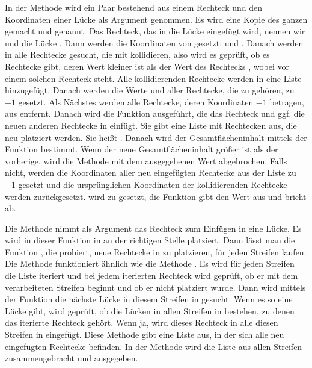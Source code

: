 In der Methode  wird ein Paar bestehend
aus einem Rechteck und den Koordinaten einer Lücke als Argument genommen.
Es wird eine Kopie des ganzen   gemacht
und  genannt. 
Das Rechteck, das in die Lücke eingefügt wird, nennen wir  und
die Lücke .
Dann werden die Koordinaten von  gesetzt:  und
.
Danach werden in  alle Rechtecke gesucht, die mit
 kollidieren, also wird es geprüft, ob es Rechtecke gibt, deren
Wert  kleiner ist als der Wert  des Rechtecks , 
wobei  vor einem solchen Rechteck steht.
Alle kollidierenden Rechtecke werden in eine Liste 
hinzugefügt. 
Danach werden die Werte  und  aller Rechtecke, die zu 
gehören, zu $-1$ gesetzt.
Als Nächstes werden alle Rechtecke, deren Koordinaten $-1$ betragen, aus 
entfernt.
Danach wird die Funktion  ausgeführt, die das Rechteck  und ggf.
die neuen anderen Rechtecke in  einfügt.
Sie gibt eine Liste mit Rechtecken aus, die neu platziert werden. Sie heißt .
Danach wird der Gesamtflächeninhalt mittels der Funktion 
bestimmt.
Wenn der neue Gesamtflächeninhalt größer ist als der vorherige,
wird die Methode  mit dem ausgegebenen Wert  abgebrochen.
Falls nicht, werden die Koordinaten
aller neu eingefügten Rechtecke aus der Liste 
zu $-1$ gesetzt und die 
ursprünglichen Koordinaten der kollidierenden Rechtecke werden zurückgesetzt. 
 wird zu  gesetzt, die Funktion gibt den Wert  
aus und bricht ab.

Die Methode  nimmt als Argument das Rechteck zum Einfügen in eine Lücke.
Es wird in dieser Funktion in  an der richtigen Stelle platziert.
Dann lässt man die Funktion ,
die probiert, neue Rechtecke in  zu platzieren, für jeden Streifen laufen. 
Die Methode  funktioniert ähnlich wie die Methode .
Es wird für jeden Streifen die Liste  iteriert und bei jedem
iterierten Rechteck  wird geprüft, ob er mit dem verarbeiteten Streifen beginnt und
ob er nicht platziert wurde.
Dann wird mittels der Funktion  die nächste Lücke in diesem Streifen
in  gesucht.
Wenn es so eine Lücke gibt, wird geprüft, ob die Lücken in allen Streifen in 
bestehen, zu denen das iterierte Rechteck gehört.
Wenn ja, wird dieses Rechteck in alle diesen Streifen in  eingefügt.
Diese Methode gibt eine Liste  aus, in der sich alle neu eingefügten Rechtecke 
befinden.
In der Methode  wird die Liste  aus
allen Streifen zusammengebracht und ausgegeben.


